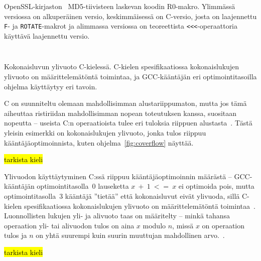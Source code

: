 \begin{listing}[ht!]
    \inputminted{C}{openssl_md5.c}

    \caption{OpenSSL-kirjaston~\citep{openssl} MD5-tiivisteen laskevan koodin
    R0-makro. Ylimmässä versiossa on alkuperäinen versio, keskimmäisessä on
    C-versio, josta on laajennettu \texttt{F}- ja \texttt{ROTATE}-makrot ja
    alimmassa versiossa on teoreettista \texttt{<<<}-operaattoria käyttävä
    laajennettu versio.}

    \label{fig:opensslmd5}
\end{listing}

\newpage

\begin{listing}[ht!]
    \inputminted{C}{c-overflow.c}
    \inputminted{text}{c-overflow-output.txt}

    \caption{Kokonaisluvun ylivuoto C-kielessä. C-kielen
    spesifikaatiossa kokonaislukujen ylivuoto on määrittelemätöntä toimintaa,
    ja GCC-kääntäjän eri optimointitasoilla ohjelma käyttäytyy eri tavoin.}
    \label{fig:coverflow}
\end{listing}

C on suunniteltu olemaan mahdollisimman alustariippumaton, mutta jos tämä
aiheuttaa ristiriidan mahdollisimman nopean toteutuksen kanssa, suositaan
nopeutta -- useista C:n operaatioista tulee eri tuloksia riippuen
alustasta~\citep[liite J, luku J.3]{C18}. Tästä yleisin esimerkki on
kokonaislukujen ylivuoto, jonka tulos riippuu kääntäjäoptimoinnista, kuten
ohjelma~\ref{fig:coverflow} näyttää.

\hl{tarkista kieli}

Ylivuodon käyttäytyminen C:ssä riippuu kääntäjäoptimoinnin määrästä --
GCC-kääntäjän optimointitasolla~0 lauseketta $x~+~1~<=~x$ ei optimoida pois,
mutta optimointitasolla~3 kääntäjä ''tietää'' että kokonaisluvut eivät
ylivuoda, sillä C-kielen spesifikaatiossa kokonaislukujen ylivuoto on
määrittelemätöntä toimintaa~\citep[liite J, luku
J.2]{C18}. Luonnollisten lukujen yli- ja alivuoto taas on määritelty -- minkä
tahansa operaation yli- tai alivuodon tulos on aina $x$ modulo $n$, missä $x$
on operaation tulos ja $n$ on yhtä suurempi kuin suurin muuttujan mahdollinen
arvo.~\citep[luku 6.2.5]{C18}.

\hl{tarkista kieli}


